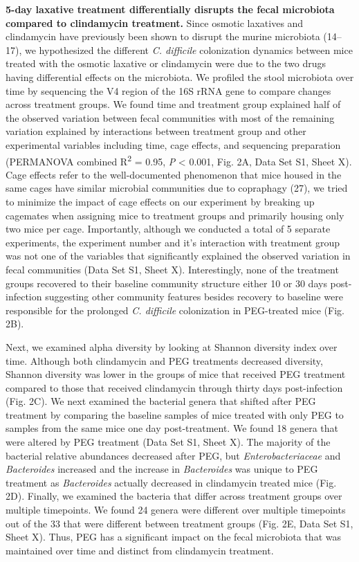 \documentclass[
  11pt,
]{article}
\begin{document}
\textbf{5-day laxative treatment differentially disrupts the fecal
microbiota compared to clindamycin treatment.} Since osmotic laxatives
and clindamycin have previously been shown to disrupt the murine
microbiota (14--17), we hypothesized the different \emph{C. difficile}
colonization dynamics between mice treated with the osmotic laxative or
clindamycin were due to the two drugs having differential effects on the
microbiota. We profiled the stool microbiota over time by sequencing the
V4 region of the 16S rRNA gene to compare changes across treatment
groups. We found time and treatment group explained half of the observed
variation between fecal communities with most of the remaining variation
explained by interactions between treatment group and other experimental
variables including time, cage effects, and sequencing preparation
(PERMANOVA combined R\textsuperscript{2} = 0.95, \emph{P} \textless{}
0.001, Fig. 2A, Data Set S1, Sheet X). Cage effects refer to the
well-documented phenomenon that mice housed in the same cages have
similar microbial communities due to copraphagy (27), we tried to
minimize the impact of cage effects on our experiment by breaking up
cagemates when assigning mice to treatment groups and primarily housing
only two mice per cage. Importantly, although we conducted a total of 5
separate experiments, the experiment number and it's interaction with
treatment group was not one of the variables that significantly
explained the observed variation in fecal communities (Data Set S1,
Sheet X). Interestingly, none of the treatment groups recovered to their
baseline community structure either 10 or 30 days post-infection
suggesting other community features besides recovery to baseline were
responsible for the prolonged \emph{C. difficile} colonization in
PEG-treated mice (Fig. 2B).

Next, we examined alpha diversity by looking at Shannon diversity index
over time. Although both clindamycin and PEG treatments decreased
diversity, Shannon diversity was lower in the groups of mice that
received PEG treatment compared to those that received clindamycin
through thirty days post-infection (Fig. 2C). We next examined the
bacterial genera that shifted after PEG treatment by comparing the
baseline samples of mice treated with only PEG to samples from the same
mice one day post-treatment. We found 18 genera that were altered by PEG
treatment (Data Set S1, Sheet X). The majority of the bacterial relative
abundances decreased after PEG, but \emph{Enterobacteriaceae} and
\emph{Bacteroides} increased and the increase in \emph{Bacteroides} was
unique to PEG treatment as \emph{Bacteroides} actually decreased in
clindamycin treated mice (Fig. 2D). Finally, we examined the bacteria
that differ across treatment groups over multiple timepoints. We found
24 genera were different over multiple timepoints out of the 33 that
were different between treatment groups (Fig. 2E, Data Set S1, Sheet X).
Thus, PEG has a significant impact on the fecal microbiota that was
maintained over time and distinct from clindamycin treatment.
\end{document}
